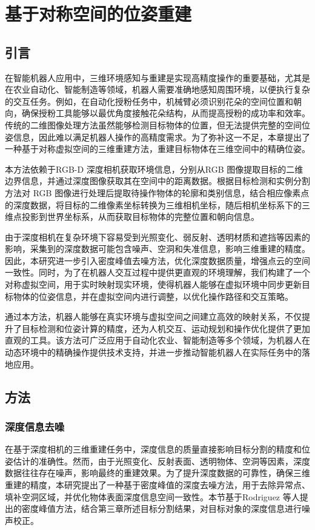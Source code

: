 
\chapter{基于对称空间的位姿重建}\label{ch:4}  \label{sec:rebuild}
\section{引言}
在智能机器人应用中，三维环境感知与重建是实现高精度操作的重要基础，尤其是在农业自动化、智能制造等领域，机器人需要准确地感知周围环境，以便执行复杂的交互任务。例如，在自动化授粉任务中，机械臂必须识别花朵的空间位置和朝向，确保授粉工具能够以最优角度接触花朵结构，从而提高授粉的成功率和效率。传统的二维图像处理方法虽然能够检测目标物体的位置，但无法提供完整的空间位姿信息，因此难以满足机器人操作的高精度需求。为了弥补这一不足，本章提出了一种基于对称虚拟空间的三维重建方法，重建目标物体在三维空间中的精确位姿。

本方法依赖于RGB-D 深度相机获取环境信息，分别从RGB 图像提取目标的二维边界信息，并通过深度图像获取其在空间中的距离数据。根据目标检测和实例分割方法对 RGB 图像进行处理后提取待操作物体的轮廓和类别信息，结合相应像素点的深度数据，将目标的二维像素坐标转换为三维相机坐标，随后相机坐标系下的三维点投影到世界坐标系，从而获取目标物体的完整位置和朝向信息。

由于深度相机在复杂环境下容易受到光照变化、弱反射、透明材质和遮挡等因素的影响，采集到的深度数据可能包含噪声、空洞和失准信息，影响三维重建的精度。因此，本研究进一步引入密度峰值去噪方法，优化深度数据质量，增强点云的空间一致性。同时，为了在机器人交互过程中提供更直观的环境理解，我们构建了一个对称虚拟空间，用于实时映射现实环境，使得机器人能够在虚拟环境中同步更新目标物体的位姿信息，并在虚拟空间内进行调整，以优化操作路径和交互策略。

通过本方法，机器人能够在真实环境与虚拟空间之间建立高效的映射关系，不仅提升了目标检测和位姿计算的精度，还为人机交互、运动规划和操作优化提供了更加直观的工具。该方法可广泛应用于自动化农业、智能制造等多个领域，为机器人在动态环境中的精确操作提供技术支持，并进一步推动智能机器人在实际任务中的落地应用。

\section{方法}

\subsection{深度信息去噪}
在基于深度相机的三维重建任务中，深度信息的质量直接影响目标分割的精度和位姿估计的准确性。然而，由于光照变化、反射表面、透明物体、空洞等因素，深度数据往往存在噪声，影响最终的重建效果。为了提升深度数据的可靠性，确保三维重建的精度，本研究提出了一种基于密度峰值的深度去噪方法，用于去除异常点、填补空洞区域，并优化物体表面深度信息空间一致性。本节基于Rodriguez 等人提出的密度峰值方法，结合第三章所述目标分割结果，对目标对象的深度信息进行噪声校正。

